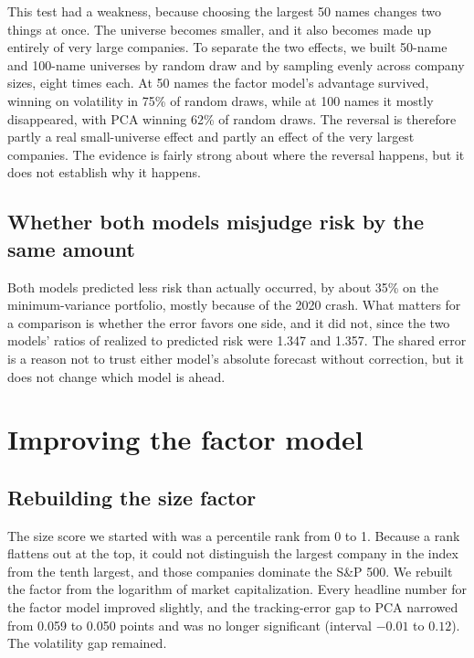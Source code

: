 \documentclass[11pt,letterpaper]{article}
\begin{document}
This test had a weakness, because choosing the largest 50 names changes two things at once.
The universe becomes smaller, and it also becomes made up entirely of very large companies.
To separate the two effects, we built 50-name and 100-name universes by random draw and by
sampling evenly across company sizes, eight times each. At 50 names the factor model's
advantage survived, winning on volatility in 75\% of random draws, while at 100 names it
mostly disappeared, with PCA winning 62\% of random draws. The reversal is therefore partly
a real small-universe effect and partly an effect of the very largest companies. The
evidence is fairly strong about where the reversal happens, but it does not establish why
it happens.

\subsection{Whether both models misjudge risk by the same amount}

Both models predicted less risk than actually occurred, by about 35\% on the
minimum-variance portfolio, mostly because of the 2020 crash. What matters for a comparison
is whether the error favors one side, and it did not, since the two models' ratios of
realized to predicted risk were 1.347 and 1.357. The shared error is a reason not to trust
either model's absolute forecast without correction, but it does not change which model is
ahead.

\section{Improving the factor model}

\subsection{Rebuilding the size factor}

The size score we started with was a percentile rank from 0 to 1. Because a rank flattens
out at the top, it could not distinguish the largest company in the index from the tenth largest,
and those companies dominate the S\&P 500. We rebuilt the factor from the logarithm of
market capitalization. Every headline number for the factor model improved slightly, and
the tracking-error gap to PCA narrowed from 0.059 to 0.050 points and was no longer
significant (interval $-0.01$ to $0.12$). The volatility gap remained.
\end{document}
